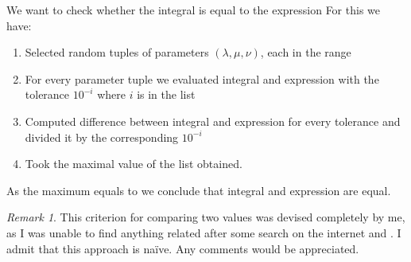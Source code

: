 \documentclass[12pt,a4paper]{article}
\theoremstyle{remark}
\newtheorem{remark}{Remark}
\begin{document}
We want to check whether the integral
is equal to the expression
For this we have:
\begin{enumerate}
	\item 
Selected 
random tuples of parameters $(\lambda,\mu,\nu)$, each in the range
\item For every parameter tuple we evaluated integral and expression with the tolerance $10^{-i}$ where $i$ is in the list
\item Computed difference between integral and expression for every tolerance and divided it by the corresponding $10^{-i}$
\item Took the maximal value of the list obtained.
\end{enumerate}
As the maximum equals to
we conclude that integral and expression are equal.
\begin{remark}
	This criterion for comparing two values was devised completely by me, as I was unable to find anything related after some search on the internet and \cite{teukolsky1992numerical}.
	I admit that this approach is na\"ive. Any comments would be appreciated.
\end{remark}
	
	
\end{document}
